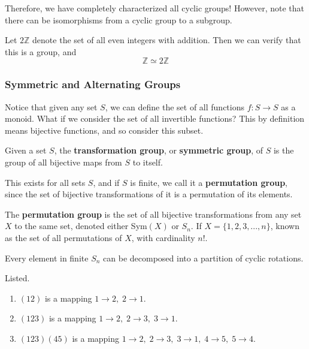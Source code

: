   Therefore, we have completely characterized all cyclic groups! However, note that there can be isomorphisms from a cyclic group to a subgroup. 

  \begin{example}
    Let $2 \mathbb{Z}$ denote the set of all even integers with addition. Then we can verify that this is a group, and 
    \begin{equation}
      \mathbb{Z} \simeq 2 \mathbb{Z}
    \end{equation}
  \end{example}

\subsubsection{Symmetric and Alternating Groups}

  Notice that given any set $S$, we can define the set of all functions $f: S \rightarrow S$ as a monoid. What if we consider the set of all invertible functions? This by definition means bijective functions, and so consider this subset.  

  \begin{definition}
    Given a set $S$, the \textbf{transformation group}, or \textbf{symmetric group}, of $S$ is the group of all bijective maps from $S$ to itself. 
  \end{definition} 

  This exists for all sets $S$, and if $S$ is finite, we call it a \textbf{permutation group}, since the set of bijective transformations of it is a permutation of its elements. 

  \begin{definition}
    The \textbf{permutation group} is the set of all bijective transformations from any set $X$ to the same set, denoted either Sym$(X)$ or $S_n$. If $X = \{1, 2, 3 ,... , n\}$, known as the set of all permutations of $X$, with cardinality $n!$. 
  \end{definition}

  \begin{lemma}
    Every element in finite $S_{n}$ can be decomposed into a partition of cyclic rotations.
  \end{lemma}

  \begin{example}
    Listed.
    \begin{enumerate}
      \item $(1 2)$ is a mapping $1 \rightarrow 2,\; 2 \rightarrow 1$. 
      \item $(1 2 3)$ is a mapping $1\rightarrow 2,\; 2 \rightarrow 3,\; 3 \rightarrow 1$. 
      \item $(1 2 3) (4 5)$ is a mapping $1\rightarrow 2,\; 2 \rightarrow 3,\; 3 \rightarrow 1, \;4 \rightarrow 5, \;5 \rightarrow 4$. 
    \end{enumerate}
  \end{example}

